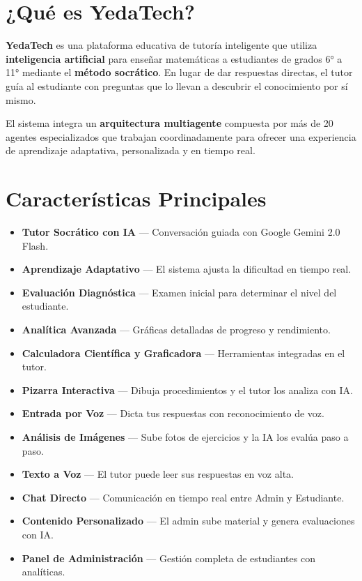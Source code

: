 \documentclass[12pt, a4paper, oneside]{book}
\begin{document}
\section{¿Qué es YedaTech?}

\textbf{YedaTech} es una plataforma educativa de tutoría inteligente que utiliza \textbf{inteligencia artificial} para enseñar matemáticas a estudiantes de grados 6° a 11° mediante el \textbf{método socrático}. En lugar de dar respuestas directas, el tutor guía al estudiante con preguntas que lo llevan a descubrir el conocimiento por sí mismo.

El sistema integra un \textbf{arquitectura multiagente} compuesta por más de 20 agentes especializados que trabajan coordinadamente para ofrecer una experiencia de aprendizaje adaptativa, personalizada y en tiempo real.

\section{Características Principales}

\begin{itemize}[leftmargin=2em]
    \item[\textcolor{yt-orange}{\faRobot}] \textbf{Tutor Socrático con IA} — Conversación guiada con Google Gemini 2.0 Flash.
    \item[\textcolor{yt-green}{\faChartLine}] \textbf{Aprendizaje Adaptativo} — El sistema ajusta la dificultad en tiempo real.
    \item[\textcolor{yt-blue}{\faClipboardCheck}] \textbf{Evaluación Diagnóstica} — Examen inicial para determinar el nivel del estudiante.
    \item[\textcolor{yt-purple}{\faChartPie}] \textbf{Analítica Avanzada} — Gráficas detalladas de progreso y rendimiento.
    \item[\textcolor{yt-cyan}{\faCalculator}] \textbf{Calculadora Científica y Graficadora} — Herramientas integradas en el tutor.
    \item[\textcolor{yt-amber}{\faChalkboard}] \textbf{Pizarra Interactiva} — Dibuja procedimientos y el tutor los analiza con IA.
    \item[\textcolor{yt-orange}{\faMicrophone}] \textbf{Entrada por Voz} — Dicta tus respuestas con reconocimiento de voz.
    \item[\textcolor{yt-green}{\faCamera}] \textbf{Análisis de Imágenes} — Sube fotos de ejercicios y la IA los evalúa paso a paso.
    \item[\textcolor{yt-blue}{\faVolumeUp}] \textbf{Texto a Voz} — El tutor puede leer sus respuestas en voz alta.
    \item[\textcolor{yt-red}{\faComments}] \textbf{Chat Directo} — Comunicación en tiempo real entre Admin y Estudiante.
    \item[\textcolor{yt-purple}{\faBook}] \textbf{Contenido Personalizado} — El admin sube material y genera evaluaciones con IA.
    \item[\textcolor{yt-cyan}{\faUsers}] \textbf{Panel de Administración} — Gestión completa de estudiantes con analíticas.
\end{itemize}
\end{document}
